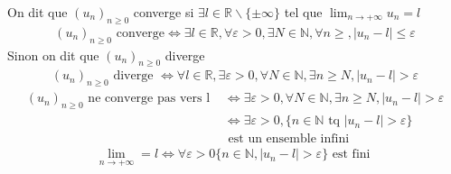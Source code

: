 \begin{graybox}
    \begin{definition}[]
    On dit que $(u_n)_{n \geqslant 0}$ converge si $\exists l \in \mathbb{R} \backslash \{\pm\infty\}$ tel que $\displaystyle{\lim_{n \to +\infty} u_n = l}$
    \begin{align*}
        (u_n)_{n \geqslant 0} \text{ converge} \iff \exists l \in \mathbb{R}, \forall \varepsilon > 0, \exists N \in \mathbb{N}, \forall n \geqslant, \left|u_n - l\right| \leqslant \varepsilon
    \end{align*}
    Sinon on dit que $(u_n)_{n \geqslant 0}$ diverge
    \begin{align*}
        (u_n)_{n \geqslant 0} \text{ diverge } \iff \forall l \in \mathbb{R}, \exists \varepsilon > 0, \forall N \in \mathbb{N}, \exists n \geqslant N, \left|u_n - l\right| > \varepsilon
    \end{align*}
    \begin{align*}
        (u_n)_{n \geqslant 0} \text{ ne converge pas vers l } &\iff \exists \varepsilon > 0, \forall N \in \mathbb{N}, \exists n \geqslant N, |u_n - l| > \varepsilon \\
        &\iff \exists \varepsilon > 0, \{n \in \mathbb{N} \text{ tq } |u_n - l| > \varepsilon\} \\ &\text{ est un ensemble infini}
    \end{align*}
    \begin{align*}
        \lim_{n \to +\infty} = l \iff \forall \varepsilon > 0 \{n \in \mathbb{N}, |u_n - l| > \varepsilon\} \text{ est fini }
    \end{align*}
\end{definition}
\end{graybox}

